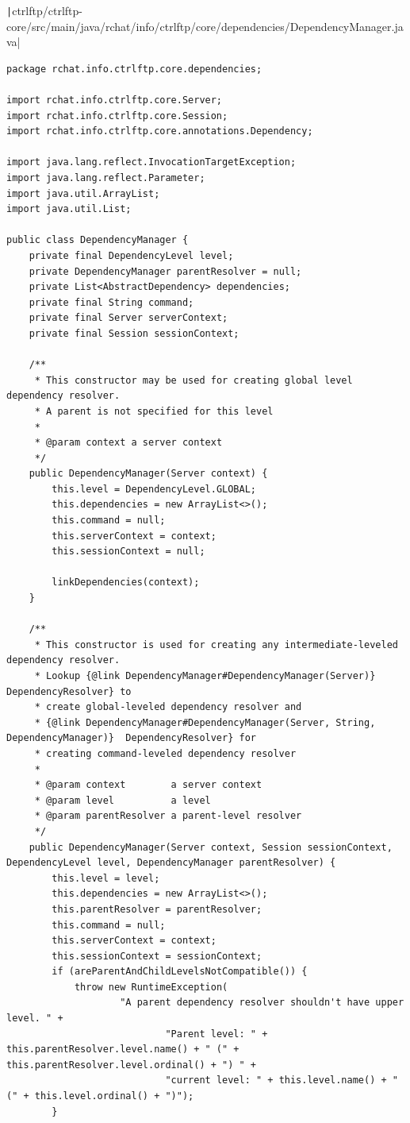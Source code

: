 \documentclass[a4paper,14pt]{extarticle}
\begin{document}
\texttt|ctrlftp/ctrlftp-core/src/main/java/rchat/info/ctrlftp/core/dependencies/DependencyManager.java|
\begin{verbatim}
package rchat.info.ctrlftp.core.dependencies;

import rchat.info.ctrlftp.core.Server;
import rchat.info.ctrlftp.core.Session;
import rchat.info.ctrlftp.core.annotations.Dependency;

import java.lang.reflect.InvocationTargetException;
import java.lang.reflect.Parameter;
import java.util.ArrayList;
import java.util.List;

public class DependencyManager {
    private final DependencyLevel level;
    private DependencyManager parentResolver = null;
    private List<AbstractDependency> dependencies;
    private final String command;
    private final Server serverContext;
    private final Session sessionContext;

    /**
     * This constructor may be used for creating global level dependency resolver.
     * A parent is not specified for this level
     *
     * @param context a server context
     */
    public DependencyManager(Server context) {
        this.level = DependencyLevel.GLOBAL;
        this.dependencies = new ArrayList<>();
        this.command = null;
        this.serverContext = context;
        this.sessionContext = null;

        linkDependencies(context);
    }

    /**
     * This constructor is used for creating any intermediate-leveled dependency resolver.
     * Lookup {@link DependencyManager#DependencyManager(Server)}  DependencyResolver} to
     * create global-leveled dependency resolver and
     * {@link DependencyManager#DependencyManager(Server, String, DependencyManager)}  DependencyResolver} for
     * creating command-leveled dependency resolver
     *
     * @param context        a server context
     * @param level          a level
     * @param parentResolver a parent-level resolver
     */
    public DependencyManager(Server context, Session sessionContext, DependencyLevel level, DependencyManager parentResolver) {
        this.level = level;
        this.dependencies = new ArrayList<>();
        this.parentResolver = parentResolver;
        this.command = null;
        this.serverContext = context;
        this.sessionContext = sessionContext;
        if (areParentAndChildLevelsNotCompatible()) {
            throw new RuntimeException(
                    "A parent dependency resolver shouldn't have upper level. " +
                            "Parent level: " + this.parentResolver.level.name() + " (" + this.parentResolver.level.ordinal() + ") " +
                            "current level: " + this.level.name() + " (" + this.level.ordinal() + ")");
        }


\end{verbatim}
\end{document}
